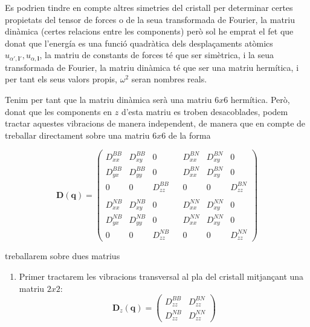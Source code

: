 \documentclass[12pt]{article} %
\let\vec\mathbf %
\begin{document}
{Es podrien tindre en compte altres simetries del cristall per determinar certes propietats del tensor de forces o de la seua transformada de Fourier, la matriu dinàmica (certes relacions entre les components) però sol he emprat el fet que donat que l'energía es una funció quadràtica dels desplaçaments atòmics $u_{\alpha',\vec l'}, u_{\alpha,\vec l}$, la matriu de constants de forces té que ser simètrica,  i la seua transformada de Fourier, la matriu dinàmica té que ser una matriu hermítica, i per tant els seus valors propis, $\omega^2$ seran nombres reals.


Tenim per tant que la matriu dinàmica serà una matriu $6x6$ hermítica. Però, donat que les components en $z$ d'esta matriu es troben desacoblades, podem tractar aquestes vibracions de manera independent, de manera que en compte de treballar directament sobre una matriu $6x6$ de la forma

\begin{equation}
  \vec D(\vec q)=
  \begin{pmatrix}
   D_{xx}^{BB} & D_{xy}^{BB} & 0 &              & D_{xx}^{BN} & D_{xy}^{BN} & 0 \\
   D_{yx}^{BB} & D_{yy}^{BB} & 0 &              & D_{xx}^{BN} & D_{xy}^{BN} & 0 \\
       0       &     0       & D_{zz}^{BB} &    & 0  & 0  & D_{zz}^{BN}        \\
    &  &  &  &  &  \\
   D_{xx}^{NB} & D_{xy}^{NB} & 0 &              & D_{xx}^{NN} & D_{xy}^{NN} & 0 \\
   D_{yx}^{NB} & D_{yy}^{NB} & 0 &              & D_{xx}^{NN} & D_{xy}^{NN} & 0 \\
       0       &     0       & D_{zz}^{NB} &    & 0  & 0  & D_{zz}^{NN} 
  \end{pmatrix}
\end{equation}

treballarem sobre dues matrius 

\begin{enumerate}
 \item Primer tractarem les vibracions transversal al pla del cristall mitjançant una matriu $2x2$:
 \begin{equation}
  \vec D_z(\vec q)=
  \begin{pmatrix}
    D_{zz}^{BB}  & D_{zz}^{BN}        \\
    D_{zz}^{NB}  & D_{zz}^{NN} 
  \end{pmatrix}
\end{equation}


\end{enumerate}}
\end{document}

